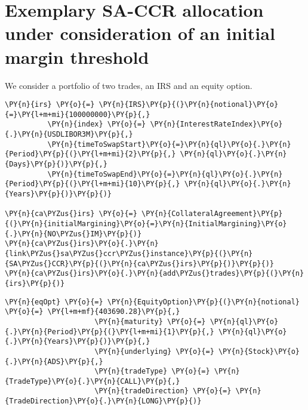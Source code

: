     

    
    \hypertarget{exemplary-sa-ccr-allocation-under-consideration-of-an-initial-margin-threshold}{%
\section{Exemplary SA-CCR allocation under consideration of an initial
margin
threshold}\label{exemplary-sa-ccr-allocation-under-consideration-of-an-initial-margin-threshold}}

We consider a portfolio of two trades, an IRS and an equity option.

    \begin{tcolorbox}[breakable, size=fbox, boxrule=1pt, pad at break*=1mm,colback=cellbackground, colframe=cellborder]
\begin{Verbatim}[commandchars=\\\{\}]
\PY{n}{irs} \PY{o}{=} \PY{n}{IRS}\PY{p}{(}\PY{n}{notional}\PY{o}{=}\PY{l+m+mi}{100000000}\PY{p}{,}
          \PY{n}{index} \PY{o}{=} \PY{n}{InterestRateIndex}\PY{o}{.}\PY{n}{USDLIBOR3M}\PY{p}{,}
          \PY{n}{timeToSwapStart}\PY{o}{=}\PY{n}{ql}\PY{o}{.}\PY{n}{Period}\PY{p}{(}\PY{l+m+mi}{2}\PY{p}{,} \PY{n}{ql}\PY{o}{.}\PY{n}{Days}\PY{p}{)}\PY{p}{,}
          \PY{n}{timeToSwapEnd}\PY{o}{=}\PY{n}{ql}\PY{o}{.}\PY{n}{Period}\PY{p}{(}\PY{l+m+mi}{10}\PY{p}{,} \PY{n}{ql}\PY{o}{.}\PY{n}{Years}\PY{p}{)}\PY{p}{)}

\PY{n}{ca\PYZus{}irs} \PY{o}{=} \PY{n}{CollateralAgreement}\PY{p}{(}\PY{n}{initialMargining}\PY{o}{=}\PY{n}{InitialMargining}\PY{o}{.}\PY{n}{NO\PYZus{}IM}\PY{p}{)}
\PY{n}{ca\PYZus{}irs}\PY{o}{.}\PY{n}{link\PYZus{}sa\PYZus{}ccr\PYZus{}instance}\PY{p}{(}\PY{n}{SA\PYZus{}CCR}\PY{p}{(}\PY{n}{ca\PYZus{}irs}\PY{p}{)}\PY{p}{)}
\PY{n}{ca\PYZus{}irs}\PY{o}{.}\PY{n}{add\PYZus{}trades}\PY{p}{(}\PY{n}{irs}\PY{p}{)}
\end{Verbatim}
\end{tcolorbox}

    \begin{tcolorbox}[breakable, size=fbox, boxrule=1pt, pad at break*=1mm,colback=cellbackground, colframe=cellborder]
\begin{Verbatim}[commandchars=\\\{\}]
\PY{n}{eqOpt} \PY{o}{=} \PY{n}{EquityOption}\PY{p}{(}\PY{n}{notional} \PY{o}{=} \PY{l+m+mf}{403690.28}\PY{p}{,}
                     \PY{n}{maturity} \PY{o}{=} \PY{n}{ql}\PY{o}{.}\PY{n}{Period}\PY{p}{(}\PY{l+m+mi}{1}\PY{p}{,} \PY{n}{ql}\PY{o}{.}\PY{n}{Years}\PY{p}{)}\PY{p}{,}
                     \PY{n}{underlying} \PY{o}{=} \PY{n}{Stock}\PY{o}{.}\PY{n}{ADS}\PY{p}{,}
                     \PY{n}{tradeType} \PY{o}{=} \PY{n}{TradeType}\PY{o}{.}\PY{n}{CALL}\PY{p}{,}
                     \PY{n}{tradeDirection} \PY{o}{=} \PY{n}{TradeDirection}\PY{o}{.}\PY{n}{LONG}\PY{p}{)}
\end{Verbatim}
\end{tcolorbox}

